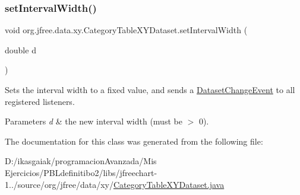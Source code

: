 \subsubsection{\texorpdfstring{set\+Interval\+Width()}{setIntervalWidth()}}
{\footnotesize\ttfamily void org.\+jfree.\+data.\+xy.\+Category\+Table\+X\+Y\+Dataset.\+set\+Interval\+Width (\begin{DoxyParamCaption}\item[{double}]{d }\end{DoxyParamCaption})}

Sets the interval width to a fixed value, and sends a \mbox{\hyperlink{}{Dataset\+Change\+Event}} to all registered listeners.


\begin{DoxyParams}{Parameters}
{\em d} & the new interval width (must be $>$ 0). \\
\hline
\end{DoxyParams}


The documentation for this class was generated from the following file\+:\begin{DoxyCompactItemize}
\item 
D\+:/ikasgaiak/programacion\+Avanzada/\+Mis Ejercicios/\+P\+B\+Ldefinitibo2/libs/jfreechart-\/1../source/org/jfree/data/xy/\mbox{\hyperlink{_category_table_x_y_dataset_8java}{Category\+Table\+X\+Y\+Dataset.\+java}}\end{DoxyCompactItemize}
